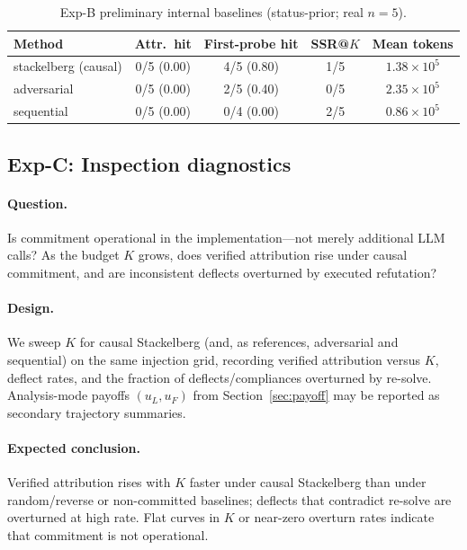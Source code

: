 \documentclass[a4paper,fleqn]{cas-sc}
\begin{document}
\begin{table}[t]
\centering
\caption{Exp-B preliminary internal baselines (status-prior; real $n{=}5$).}
\label{tab:exp_baselines_prelim}
\label{tab:exp_ii_prelim}
\begin{tabular}{@{}l c c c c@{}}
\toprule
Method & Attr.\ hit & First-probe hit & SSR@$K$ & Mean tokens \\
\midrule
stackelberg (causal) & 0/5 (0.00) & 4/5 (0.80) & 1/5 & $1.38{\times}10^{5}$ \\
adversarial & 0/5 (0.00) & 2/5 (0.40) & 0/5 & $2.35{\times}10^{5}$ \\
sequential & 0/5 (0.00) & 0/4 (0.00) & 2/5 & $0.86{\times}10^{5}$ \\
\bottomrule
\end{tabular}
\end{table}

\subsection{Exp-C: Inspection diagnostics}
\label{sec:exp_diag}
\label{sec:exp_iv}

\paragraph{Question.}
Is commitment operational in the implementation---not merely additional LLM
calls? As the budget $K$ grows, does verified attribution rise under causal
commitment, and are inconsistent deflects overturned by executed refutation?

\paragraph{Design.}
We sweep $K$ for causal Stackelberg (and, as references, adversarial and
sequential) on the same injection grid, recording verified attribution versus
$K$, deflect rates, and the fraction of deflects/compliances overturned by
re-solve. Analysis-mode payoffs $(u_L,u_F)$ from Section~\ref{sec:payoff}
may be reported as secondary trajectory summaries.

\paragraph{Expected conclusion.}
Verified attribution rises with $K$ faster under causal Stackelberg than under
random/reverse or non-committed baselines; deflects that contradict re-solve
are overturned at high rate. Flat curves in $K$ or near-zero overturn rates
indicate that commitment is not operational.
\end{document}
